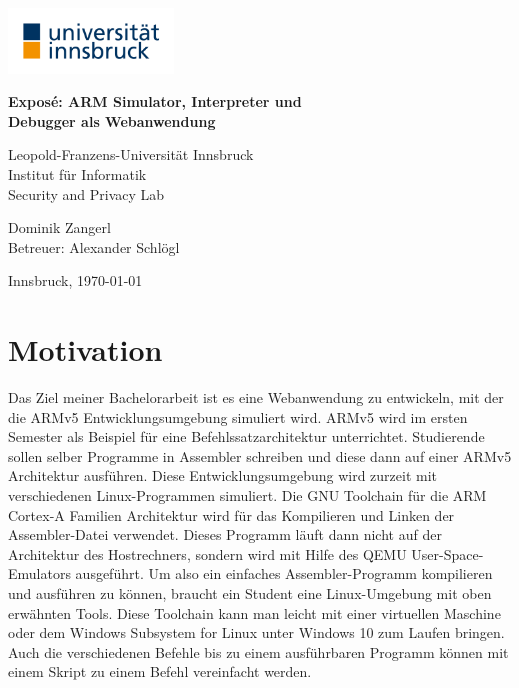\documentclass[a4paper, 11pt, onecolumn]{article}
\providecommand{\keywords}[1]
{
  \noindent \textbf{Schlüsselwörter } #1
}
\begin{document}
\renewcommand{\abstractname}{Kurzfassung}
    \begin{center}

        \includegraphics[width=0.33\textwidth]{data/uibk} 
        
		\LARGE
        \textbf{Exposé: ARM Simulator, Interpreter und\\Debugger als Webanwendung\\}
        
		\vspace{0.2cm}        
            
        \large
        Leopold-Franzens-Universität Innsbruck\\
        Institut für Informatik\\
		Security and Privacy Lab
		
		\vspace{0.4cm}   
		
		\Large  
        Dominik Zangerl\\
		Betreuer: Alexander Schlögl  
                
        \vspace{0.4cm}
        
        \large    
        Innsbruck, \today
           
    \end{center}
    
%
%
%

\section{Motivation}

Das Ziel meiner Bachelorarbeit ist es eine Webanwendung zu entwickeln, mit der die ARMv5 Entwicklungsumgebung simuliert wird. ARMv5 \cite{arm:2005} wird im ersten Semester als Beispiel für eine Befehlssatzarchitektur unterrichtet. Studierende sollen selber Programme in Assembler schreiben und diese dann auf einer ARMv5 Architektur ausführen. Diese Entwicklungsumgebung wird zurzeit mit verschiedenen Linux-Programmen simuliert. Die GNU Toolchain für die ARM Cortex-A Familien Architektur \cite{gnutoolchain} wird für das Kompilieren und Linken der Assembler-Datei verwendet. Dieses Programm läuft dann nicht auf der Architektur des Hostrechners, sondern wird mit Hilfe des QEMU User-Space-Emulators \cite{qemu} ausgeführt. Um also ein einfaches Assembler-Programm kompilieren und ausführen zu können, braucht ein Student eine Linux-Umgebung mit oben erwähnten Tools. Diese Toolchain kann man leicht mit einer virtuellen Maschine oder dem Windows Subsystem for Linux \cite{wsl} unter Windows 10 zum Laufen bringen. Auch die verschiedenen Befehle bis zu einem ausführbaren Programm können mit einem Skript zu einem Befehl vereinfacht werden.
\end{document}
